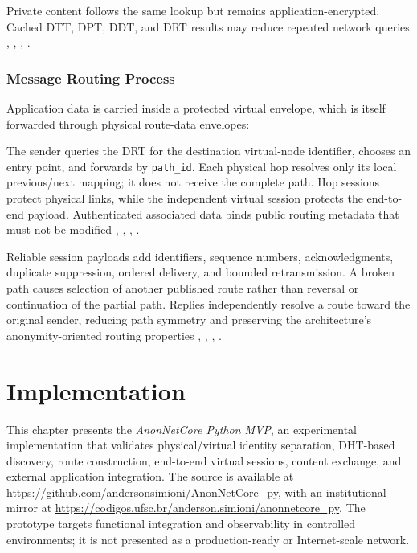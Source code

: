 \documentclass[
  12pt,
  oneside,
  a4paper,
  chapter=TITLE,
  section=TITLE,
  english,
  brazil
]{abntex2}
\begin{document}
Private content follows the same lookup but remains application-encrypted. Cached DTT,
DPT, DDT, and DRT results may reduce repeated network queries \cite{augustine2022byzantine}, \cite{qian2016garlic}, \cite{bos2017kyber}, \cite{nist2024fips203}.

\subsection{Message Routing Process}

Application data is carried inside a protected virtual envelope, which is itself
forwarded through physical route-data envelopes:

\thesisdeliverytikz

The sender queries the DRT for the destination virtual-node identifier, chooses an
entry point, and forwards by \texttt{path\_id}. Each physical hop resolves only its
local previous/next mapping; it does not receive the complete path. Hop sessions
protect physical links, while the independent virtual session protects the end-to-end
payload. Authenticated associated data binds public routing metadata that must not be
modified \cite{li2022unreachable}, \cite{mirzaei2018pk}, \cite{bos2017kyber}, \cite{nist2024fips203}.

Reliable session payloads add identifiers, sequence numbers, acknowledgments,
duplicate suppression, ordered delivery, and bounded retransmission. A broken path
causes selection of another published route rather than reversal or continuation of
the partial path. Replies independently resolve a route toward the original sender,
reducing path symmetry and preserving the architecture's anonymity-oriented routing
properties \cite{tosic2022spatial}, \cite{augustine2022byzantine}, \cite{mirzaei2018pk}, \cite{qian2016garlic}.












\chapter{Implementation}

This chapter presents the \textit{AnonNetCore Python MVP}, an experimental implementation that validates physical/virtual identity separation, DHT-based discovery, route construction, end-to-end virtual sessions, content exchange, and external application integration. The source is available at \url{https://github.com/andersonsimioni/AnonNetCore_py}, with an institutional mirror at \url{https://codigos.ufsc.br/anderson.simioni/anonnetcore_py}. The prototype targets functional integration and observability in controlled environments; it is not presented as a production-ready or Internet-scale network.
\end{document}
